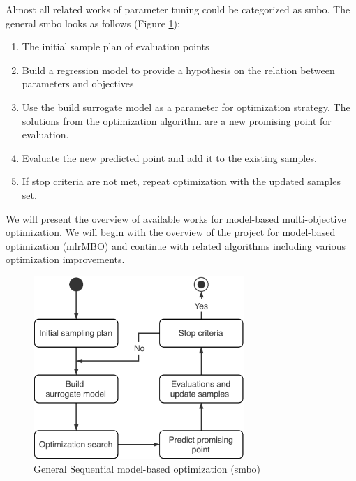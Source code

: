         Almost all related works of parameter tuning could be categorized as \gls{smbo}\cite{JonesSW98}.
        The general \gls{smbo} looks as follows (Figure \ref{fig:sequential_mbo}):
        \begin{enumerate}
            \item The initial sample plan of evaluation points
            \item Build a regression model to provide a hypothesis on the relation between parameters and objectives
            \item Use the build surrogate model as a parameter for optimization strategy. The solutions from the optimization algorithm are a new promising point for evaluation.
            \item Evaluate the new predicted point and add it to the existing samples.
            \item If stop criteria are not met, repeat optimization with the updated samples set.
        \end{enumerate}
        We will present the overview of available works for model-based multi-objective optimization. We will begin with the overview of the project for model-based optimization (mlrMBO) and continue with related algorithms including various optimization improvements.

        \begin{figure}
            \centering 
            \includegraphics[width=8cm]{content/images/utility/sequential_mbo}
            \caption[General Sequential model-based optimization]{General Sequential model-based optimization (\Gls{smbo})} 
            \label{fig:sequential_mbo} 
        \end{figure}



